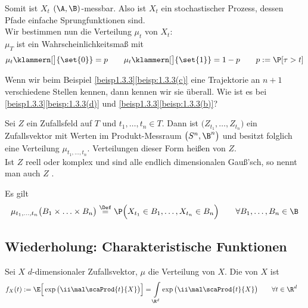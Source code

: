 \begin{beispiel}
\begin{enumerate}[label=(\alph*)]
\begin{lösung}
			Somit ist $X_t$ $(\A,\B)$-messbar.
			Also ist $X_t$ ein stochastischer Prozess, dessen Pfade einfache Sprungfunktionen sind.\\
			Wir bestimmen nun die Verteilung $\mu_t$ von $X_t$:\\
			$\mu_T$ ist ein Wahrscheinlichkeitsmaß mit
			\begin{align*}
				\mu_t\klammern[\big]{\set{0}}=p\qquad
				\mu_t\klammern[\big]{\set{1}}=1-p\qquad
				p:=\P[\tau>t]
			\end{align*}
		\end{lösung}
	\end{enumerate}
\end{beispiel}

\begin{aufgabenr}\label{aufg:5}\enter
	Wenn wir beim Beispiel \ref{beisp1.3.3}\ref{beisp:1.3.3(c)} eine Trajektorie an $n+1$ verschiedene Stellen kennen, dann kennen wir sie überall.
	Wie ist es bei \ref{beisp1.3.3}\ref{beisp:1.3.3(d)} und \ref{beisp1.3.3}\ref{beisp:1.3.3(b)}?
\end{aufgabenr}

\setcounter{satz}{4} %

\begin{definition}\label{def:1.3.5}
	Sei $Z$ ein Zufallsfeld auf $T$ und $t_1,\ldots,t_n\in T$.
	Dann ist $\big(Z_{t_1},\ldots,Z_{t_n}\big)$ ein Zufallsvektor mit Werten im Produkt-Messraum $\big(S^n,\B^n\big)$ und besitzt folglich eine Verteilung $\mu_{t_1,\ldots,t_n}$.
	Verteilungen dieser Form heißen  von $Z$. \\
	Ist $Z$ reell oder komplex und sind alle endlich dimensionalen Gauß'sch, so nennt man auch $Z$ .
\end{definition}

\begin{bemerkung}
	Es gilt
	\begin{align*}
		\mu_{t_1,\ldots,t_n}\big(B_1\times\ldots\times B_n\big)
		\overset{\Def}{=}
		\P\Big(X_{t_1}\in B_1,\ldots,X_{t_n}\in B_n\Big)\qquad\forall B_1,\ldots,B_n\in\B
	\end{align*}
\end{bemerkung}

\subsection*{Wiederholung: Charakteristische Funktionen}
\begin{defi}
	Sei $X$ $d$-dimensionaler Zufallsvektor, $\mu$ die Verteilung von $X$.
	Die  von $X$ ist
	\begin{align*}
		f_X(t)&:=\E\Big[\exp\big(\ii\mal\scaProd{t}{X}\big)\Big]
		=\int\limits_{\R^d}\exp\big(\ii\mal\scaProd{t}{X}\big)\qquad\forall t\in\R^d
	\end{align*}
\end{defi}

